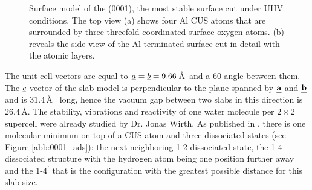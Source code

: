 \documentclass[11pt,DIV=13,BCOR=5mm,a4paper,headinclude]{scrbook}
\def\mathbi#1{\textbf{\em #1}}
\renewcommand{\vec}[1]{\mathbi{#1}}
\begin{document}
\begin{figure}[!ht]
 \centering
{}
 \quad\quad
 \caption{Surface model of the (0001), the most stable surface cut under UHV conditions.
The top view (a) shows four Al CUS atoms that are surrounded by three threefold coordinated surface oxygen atoms.
(b) reveals the side view of the Al terminated surface cut in detail with the atomic layers.}
        \label{abb:surf_0001}
\end{figure}
The unit cell vectors are equal to $\uline{a}=\uline{b}=9.66\,$\AA  ~and a $60$\textdegree{} angle between them.
The $\uline{c}$-vector of the slab model is perpendicular to the plane spanned by $\vec{a}$ and $\vec{b}$ and is $31.4\,$\AA~ long, hence the vacuum gap between two slabs in this direction is $26.4\,$\AA.
The stability, vibrations and reactivity of one water  molecule per $2\times 2$ supercell were already studied by Dr. Jonas Wirth.
As published in \cite{WirthJPCC2012}, there is one molecular minimum on top of a CUS atom and three dissociated states (see Figure \ref{abb:0001_ads}): the next neighboring 1-2 dissociated state, the 1-4 dissociated structure with the hydrogen atom being one position further away and the 1-4$^\prime$ that is the configuration with the greatest possible distance for this slab size.
\end{document}
